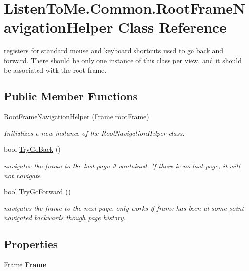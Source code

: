 \hypertarget{class_listen_to_me_1_1_common_1_1_root_frame_navigation_helper}{}\section{Listen\+To\+Me.\+Common.\+Root\+Frame\+Navigation\+Helper Class Reference}
\label{class_listen_to_me_1_1_common_1_1_root_frame_navigation_helper}


registers for standard mouse and keyboard shortcuts used to go back and forward. There should be only one instance of this class per view, and it should be associated with the root frame.  


\subsection*{Public Member Functions}
\begin{DoxyCompactItemize}
\item 
\hyperlink{class_listen_to_me_1_1_common_1_1_root_frame_navigation_helper_a4c7cd3f089e03e6c1c7700054992185e}{Root\+Frame\+Navigation\+Helper} (Frame root\+Frame)
\begin{DoxyCompactList}\small\item\em Initializes a new instance of the Root\+Navigation\+Helper class. \end{DoxyCompactList}\item 
bool \hyperlink{class_listen_to_me_1_1_common_1_1_root_frame_navigation_helper_abe5766b86ae071ae6eebb19749404005}{Try\+Go\+Back} ()
\begin{DoxyCompactList}\small\item\em navigates the frame to the last page it contained. If there is no last page, it will not navigate \end{DoxyCompactList}\item 
bool \hyperlink{class_listen_to_me_1_1_common_1_1_root_frame_navigation_helper_a39b381da6acb50b24c85175b6da8ee12}{Try\+Go\+Forward} ()
\begin{DoxyCompactList}\small\item\em navigates the frame to the next page. only works if frame has been at some point navigated backwards though page history. \end{DoxyCompactList}\end{DoxyCompactItemize}
\subsection*{Properties}
\begin{DoxyCompactItemize}
\item 
Frame {\bfseries Frame}\hypertarget{class_listen_to_me_1_1_common_1_1_root_frame_navigation_helper_ab9ed9b25dd17d7ea1982303c5d6e0116}{}\label{class_listen_to_me_1_1_common_1_1_root_frame_navigation_helper_ab9ed9b25dd17d7ea1982303c5d6e0116}

\end{DoxyCompactItemize}


